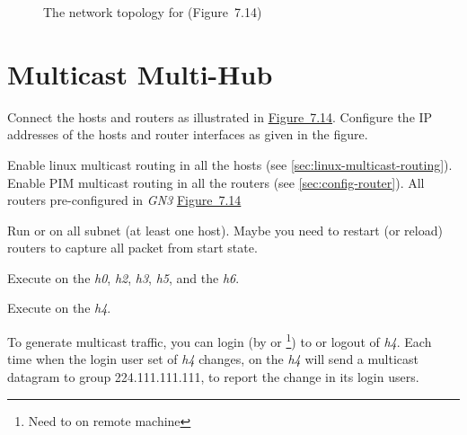 \documentclass{../UTNetLab}
\begin{document}
\begin{figure}[H]
        \caption{The network topology for  (Figure~7.14)}
        \label{fig:7.14}
    \end{figure}

\section{Multicast Multi-Hub}
    Connect the hosts and routers as illustrated in \hyperref[fig:7.14]{Figure~7.14}.
    Configure the IP addresses of the hosts and router interfaces as given in the figure.


    Enable linux multicast routing in all the hosts (see \autoref{sec:linux-multicast-routing}).
    Enable PIM multicast routing in all the routers (see \autoref{sec:config-router}).
    All routers pre-configured in \textit{GN3} \hyperref[fig:7.14]{Figure~7.14}

    Run  or  on all subnet (at least one host).
    Maybe you need to restart (or reload) routers to capture all packet from start state.

    Execute  on the \textit{h0}, \textit{h2}, \textit{h3}, \textit{h5}, and the \textit{h6}.

    Execute  on the \textit{h4}.
    
    To generate multicast traffic, you can login (by  or \footnote{Need to  on remote machine}) to or logout of \textit{h4}.
    Each time when the login user set of \textit{h4} changes,  on the \textit{h4} will send a multicast datagram to group 224.111.111.111, to report the change in its login users.
\end{document}
